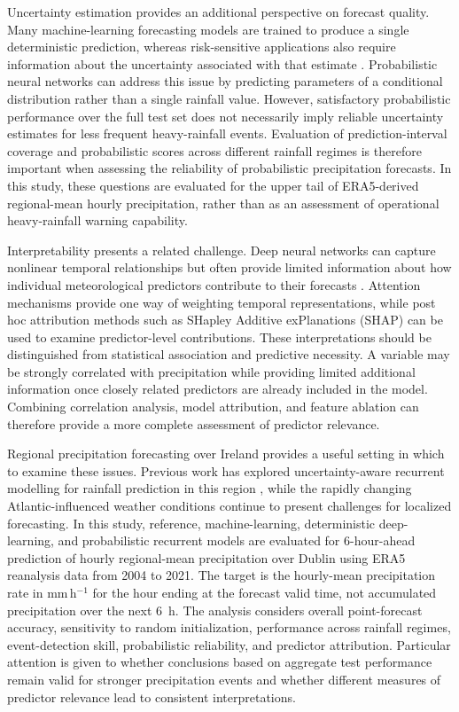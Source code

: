 Uncertainty estimation provides an additional perspective on forecast quality. Many machine-learning forecasting models are trained to produce a single deterministic prediction, whereas risk-sensitive applications also require information about the uncertainty associated with that estimate \citep{yang2024interpretable}. Probabilistic neural networks can address this issue by predicting parameters of a conditional distribution rather than a single rainfall value. However, satisfactory probabilistic performance over the full test set does not necessarily imply reliable uncertainty estimates for less frequent heavy-rainfall events. Evaluation of prediction-interval coverage and probabilistic scores across different rainfall regimes is therefore important when assessing the reliability of probabilistic precipitation forecasts. In this study, these questions are evaluated for the upper tail of ERA5-derived regional-mean hourly precipitation, rather than as an assessment of operational heavy-rainfall warning capability.

Interpretability presents a related challenge. Deep neural networks can capture nonlinear temporal relationships but often provide limited information about how individual meteorological predictors contribute to their forecasts \citep{du2019techniques}. Attention mechanisms provide one way of weighting temporal representations, while post hoc attribution methods such as SHapley Additive exPlanations (SHAP) \citep{lundberg2017unified} can be used to examine predictor-level contributions. These interpretations should be distinguished from statistical association and predictive necessity. A variable may be strongly correlated with precipitation while providing limited additional information once closely related predictors are already included in the model. Combining correlation analysis, model attribution, and feature ablation can therefore provide a more complete assessment of predictor relevance.

Regional precipitation forecasting over Ireland provides a useful setting in which to examine these issues. Previous work has explored uncertainty-aware recurrent modelling for rainfall prediction in this region \citep{10906190}, while the rapidly changing Atlantic-influenced weather conditions continue to present challenges for localized forecasting. In this study, reference, machine-learning, deterministic deep-learning, and probabilistic recurrent models are evaluated for 6-hour-ahead prediction of hourly regional-mean precipitation over Dublin using ERA5 reanalysis data from 2004 to 2021. The target is the hourly-mean precipitation rate in mm\,h$^{-1}$ for the hour ending at the forecast valid time, not accumulated precipitation over the next 6~h. The analysis considers overall point-forecast accuracy, sensitivity to random initialization, performance across rainfall regimes, event-detection skill, probabilistic reliability, and predictor attribution. Particular attention is given to whether conclusions based on aggregate test performance remain valid for stronger precipitation events and whether different measures of predictor relevance lead to consistent interpretations.

